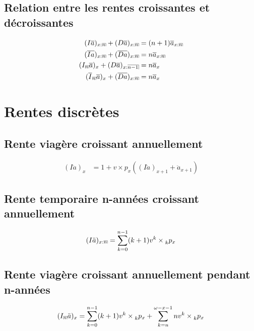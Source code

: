 \documentclass[11pt,french]{report}
\makeatletter
\DeclareRobustCommand{\annuity}[1]{%
\def\arraystretch{0}%
\setlength\arraycolsep{.7pt}%
\setlength\arrayrulewidth{.3pt}%
\begin{array}[b]{@{}c|}\hline
\\[\arraycolsep]%
\scriptstyle #1%
\end{array}%
}
\newcommand{\indiceGauche}[2]{{\vphantom{#2}}_{#1}#2}
\makeatother
\begin{document}
\subsection{Relation entre les rentes croissantes et décroissantes}
\begin{align*}
(I\overline{a})_{x:\annuity{n}}  + (D\overline{a})_{x:\annuity{n}}  &= (n+1) \overline{a}_{x:\annuity{n}} \\
(\overline{Ia})_{x:\annuity{n}}  + (\overline{Da})_{x:\annuity{n}}  &= n \overline{a}_{x:\annuity{n}} \\
(I_{\annuity{n}}\overline{a})_{x}  + (D\overline{a})_{x:\annuity{n-1}}  &= n\overline{a}_{x} \\
(\overline{I}_{\annuity{n}}\overline{a})_{x}  + (\overline{Da})_{x:\annuity{n}}  &= n\overline{a}_{x} \\
\end{align*}

\section{Rentes discrètes}

\subsection{Rente viagère croissant annuellement}
\begin{align*}
(I\ddot{a})_x &= 1 + v \times p_x ( (I\ddot{a})_{x+1} + \ddot{a}_{x+1}  )
\end{align*}

\subsection{Rente temporaire n-années croissant annuellement}
\begin{align*}
(I\ddot{a})_{x:\annuity{n}} &= \sum_{k=0}^{n -1} (k+1) v^k \times \indiceGauche{k}{p}_{x} \\
\end{align*}

\subsection{Rente viagère croissant annuellement pendant n-années}
\begin{align*}
(I_{\annuity{n}}\ddot{a})_{x} &= \sum_{k=0}^{n -1} (k+1) v^k \times  \indiceGauche{k}{p}_{x} +  \sum_{k=n}^{\omega - x -1} n v^k \times  \indiceGauche{k}{p}_{x}\\
\end{align*}
\end{document}
